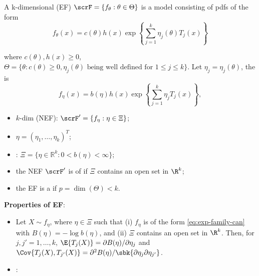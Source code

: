 \documentclass[10pt,a4paper]{article}
\begin{document}
\begin{defbox}
	\begin{definition}\label{def:exp-family}
		A k-dimensional  (EF) $\scrF=\{f_\theta:\theta\in\Theta\}$ is a model consisting of pdfs of the form
		\begin{equation}\label{eq:exp-family-pdf}
			f_\theta(x)=c(\theta)h(x)\exp\left\{\sum_{j=1}^k\eta_j(\theta)T_j(x)\right\}
		\end{equation}
	\end{definition}
	where $c(\theta),h(x)\geq 0$, $\Theta=\{\theta:c(\theta)\geq 0, \eta_j(\theta) \text{ being well defined for } 1\leq j\leq k\}$. Let $\eta_j=\eta_j(\theta)$, the  is 
	\begin{equation}\label{eq:exp-family-can}
		f_\eta(x)=b(\eta)h(x)\exp\left\{\sum_{j=1}^k\eta_jT_j(x)\right\},
	\end{equation}
	\begin{itemize}[itemsep=2pt,topsep=0pt,parsep=0pt]
		\item $k$-dim  (NEF): $\scrF'=\{f_{\eta}:\eta\in \Xi\}$; 
		\item {} $\eta=(\eta_1,\ldots,\eta_k)^T$;
		\item {}: $\Xi=\{\eta\in\mathbb{R}^k:0<b(\eta)<\infty\}$; 
		\item the NEF $\scrF'$ is of  if $\Xi$ contains an open set in $\R^k$;
		\item the EF is a  if $p=\dim(\Theta)<k$.
	\end{itemize}
\end{defbox}
\textbf{Properties of EF}:
\begin{itemize}[itemsep=2pt,topsep=0pt,parsep=0pt]
	\item Let $X\sim f_{\eta}$, where $\eta\in\Xi$ such that (i) $f_{\eta}$ is of the form \eqref{eq:exp-family-can} with $B(\eta)=-\log b(\eta)$, and (ii) $\Xi$ contains an open set in $\R^k$. Then, for $j,j'=1,\ldots,k$, $\E\{T_j(X)\}={\partial B(\eta)}/{\partial\eta_j}$ and $\Cov\{T_j(X),T_{j'}(X)\}={\partial^2B(\eta)}/\sbk{\partial\eta_j\partial\eta_{j'}}$.  
	\item {}:
\end{itemize}
\end{document}
